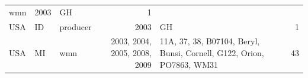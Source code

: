 \begin{longtable}[]{@{}lllrlr@{}}
\begin{minipage}[t]{0.12\columnwidth}
wmn\strut
\end{minipage} & \begin{minipage}[t]{0.19\columnwidth}\raggedleft\strut
2003\strut
\end{minipage} & \begin{minipage}[t]{0.29\columnwidth}\raggedright\strut
GH\strut
\end{minipage} & \begin{minipage}[t]{0.04\columnwidth}\raggedleft\strut
1\strut
\end{minipage}\tabularnewline
\begin{minipage}[t]{0.11\columnwidth}\raggedright\strut
USA\strut
\end{minipage} & \begin{minipage}[t]{0.08\columnwidth}\raggedright\strut
ID\strut
\end{minipage} & \begin{minipage}[t]{0.12\columnwidth}\raggedright\strut
producer\strut
\end{minipage} & \begin{minipage}[t]{0.19\columnwidth}\raggedleft\strut
2003\strut
\end{minipage} & \begin{minipage}[t]{0.29\columnwidth}\raggedright\strut
GH\strut
\end{minipage} & \begin{minipage}[t]{0.04\columnwidth}\raggedleft\strut
1\strut
\end{minipage}\tabularnewline
\begin{minipage}[t]{0.11\columnwidth}\raggedright\strut
USA\strut
\end{minipage} & \begin{minipage}[t]{0.08\columnwidth}\raggedright\strut
MI\strut
\end{minipage} & \begin{minipage}[t]{0.12\columnwidth}\raggedright\strut
wmn\strut
\end{minipage} & \begin{minipage}[t]{0.19\columnwidth}\raggedleft\strut
2003, 2004, 2005, 2008, 2009\strut
\end{minipage} & \begin{minipage}[t]{0.29\columnwidth}\raggedright\strut
11A, 37, 38, B07104, Beryl, Bunsi, Cornell, G122, Orion, PO7863,
WM31\strut
\end{minipage} & \begin{minipage}[t]{0.04\columnwidth}\raggedleft\strut
43\strut
\end{minipage}\tabularnewline

\end{longtable}

